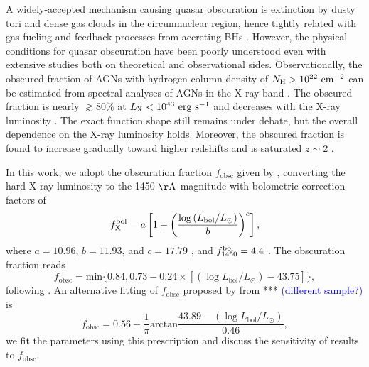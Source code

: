 \documentclass[twocolumn, twocolappendix]{aastex63}
\newcommand{\fobsc}{f_\mathrm{obsc}}
\newcommand{\Lbol}{L_\mathrm{bol}}
\newcommand{\red}[1]{\textcolor{red}{ #1}}
\newcommand{\blue}[1]{\textcolor{blue}{ #1}}
\begin{document}
\begin{CJK*}{UTF8}{gbsn}
A widely-accepted mechanism causing quasar obscuration is extinction by dusty tori and dense gas clouds 
in the circumnuclear region, hence tightly related with gas fueling and feedback processes from accreting BHs 
\citep[see][for a review]{2018ARA&A..56..625H}.
However, the physical conditions for quasar obscuration have been poorly understood even with extensive studies both on theoretical and observational sides. 
Observationally, the obscured fraction of AGNs with hydrogen column density of $N_{\rm H}>10^{22}~{\rm cm}^{-2}$
can be estimated from spectral analyses of AGNs in the X-ray band
\citep[e.g.,][]{2003ApJ...598..886U,2007A&A...463...79G,2008A&A...490..905H}. 
The obscured fraction is nearly $\gtrsim 80\%$ at $L_{\rm X}<10^{43}~{\rm erg~s}^{-1}$ and 
decreases with the X-ray luminosity \citep{2014ApJ...786..104U,2014MNRAS.437.3550M}.
The exact function shape still remains under debate, but the overall dependence on the X-ray luminosity holds.
Moreover, the obscured fraction is found to increase gradually toward higher redshifts and is saturated $z\sim 2$
\citep{2008A&A...490..905H,2014ApJ...786..104U,2014MNRAS.437.3550M,2018MNRAS.473.2378V}.


In this work, we adopt the obscuration fraction $\fobsc$ given by \citet{2014ApJ...786..104U}, 
converting the hard X-ray luminosity to the 1450 $\mathrm{\AA}$ magnitude with bolometric correction factors of
\begin{equation*}
  f^{\rm bol}_{\rm X} =
  a\left[1+\left(\frac{\log \left(\Lbol / L_\odot\right)}{b}\right)^{c}\right],
\end{equation*}
where $a=10.96$, $b = 11.93$, and $c = 17.79$ \citep[Eq. 2 in ][]{2020A&A...636A..73D}, 
and $f^{\rm bol}_{1450}=4.4$ \citep{2006ApJS..166..470R}.
The obscuration fraction reads 
\begin{equation*}
  \fobsc = \text{min}\lbrace  0.84 , 0.73-0.24\times[ (\log \Lbol/L_\odot) -43.75] \rbrace,
\end{equation*}
following \citet{2014ApJ...786..104U}.
An alternative fitting of $\fobsc$ proposed by \citet{2014MNRAS.437.3550M} from *** \blue{(different sample?)} is 
\begin{equation*}
  \fobsc = 0.56 + \frac{1}{\pi} \text{arctan} \frac{43.89 - (\log \Lbol/L_\odot)}{0.46},
\end{equation*}
we fit the parameters using this prescription and discuss the sensitivity of results to $\fobsc$.


\end{CJK*}
\end{document}
